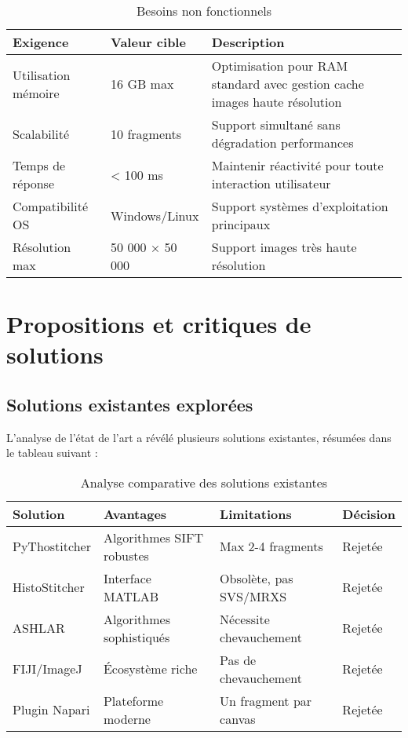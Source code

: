 \documentclass[12pt,a4paper]{report}
\begin{document}
\begin{table}[H]
\centering
\begin{tabular}{|p{4cm}|p{3cm}|p{7cm}|}
\hline
\rowcolor{TableHeaderColor}
\textbf{Exigence} & \textbf{Valeur cible} & \textbf{Description} \\
\hline
Utilisation mémoire & 16 GB max & Optimisation pour RAM standard avec gestion cache images haute résolution \\
\hline
Scalabilité & 10 fragments & Support simultané sans dégradation performances \\
\hline
Temps de réponse & < 100 ms & Maintenir réactivité pour toute interaction utilisateur \\
\hline
Compatibilité OS & Windows/Linux & Support systèmes d'exploitation principaux \\
\hline
Résolution max & 50 000 × 50 000 & Support images très haute résolution \\
\hline
\end{tabular}
\caption{Besoins non fonctionnels}
\end{table}

\section{Propositions et critiques de solutions}

\subsection{Solutions existantes explorées}

L'analyse de l'état de l'art a révélé plusieurs solutions existantes, résumées dans le tableau suivant :

\begin{table}[H]
\centering
\begin{tabular}{|p{3cm}|p{4cm}|p{4cm}|p{3cm}|}
\hline
\rowcolor{TableHeaderColor}
\textbf{Solution} & \textbf{Avantages} & \textbf{Limitations} & \textbf{Décision} \\
\hline
PyThostitcher & Algorithmes SIFT robustes & Max 2-4 fragments & Rejetée \\
\hline
HistoStitcher & Interface MATLAB & Obsolète, pas SVS/MRXS & Rejetée \\
\hline
ASHLAR & Algorithmes sophistiqués & Nécessite chevauchement & Rejetée \\
\hline
FIJI/ImageJ & Écosystème riche & Pas de chevauchement & Rejetée \\
\hline
Plugin Napari & Plateforme moderne & Un fragment par canvas & Rejetée \\
\hline
\end{tabular}
\caption{Analyse comparative des solutions existantes}
\end{table}
\end{document}
